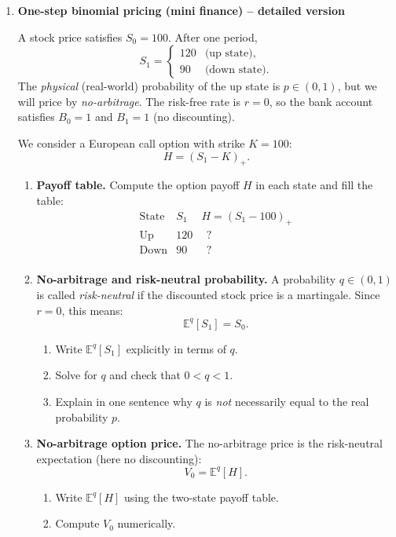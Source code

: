 \documentclass[11pt]{article}
\begin{document}
\begin{enumerate}
\bigskip

\item \textbf{One-step binomial pricing (mini finance) -- detailed version}

A stock price satisfies \(S_0=100\). After one period,
\[
S_1=
\begin{cases}
120 & \text{(up state)},\\
90  & \text{(down state)}.
\end{cases}
\]
The \emph{physical} (real-world) probability of the up state is \(p\in(0,1)\),
but we will price by \emph{no-arbitrage}. The risk-free rate is \(r=0\),
so the bank account satisfies \(B_0=1\) and \(B_1=1\) (no discounting).

We consider a European call option with strike \(K=100\):
\[
H=(S_1-K)_+.
\]

\begin{enumerate}
\item \textbf{Payoff table.}
Compute the option payoff \(H\) in each state and fill the table:
\[
\begin{array}{c|c|c}
\text{State} & S_1 & H=(S_1-100)_+\\ \hline
\text{Up} & 120 & \ \ ? \ \\
\text{Down} & 90 & \ \ ? \ \\
\end{array}
\]

\item \textbf{No-arbitrage and risk-neutral probability.}
A probability \(q\in(0,1)\) is called \emph{risk-neutral} if the discounted stock price
is a martingale. Since \(r=0\), this means:
\[
\mathbb{E}^q[S_1]=S_0.
\]
\begin{enumerate}
\item Write \(\mathbb{E}^q[S_1]\) explicitly in terms of \(q\).
\item Solve for \(q\) and check that \(0<q<1\).
\item Explain in one sentence why \(q\) is \emph{not} necessarily equal to the real probability \(p\).
\end{enumerate}

\item \textbf{No-arbitrage option price.}
The no-arbitrage price is the risk-neutral expectation (here no discounting):
\[
V_0=\mathbb{E}^q[H].
\]
\begin{enumerate}
\item Write \(\mathbb{E}^q[H]\) using the two-state payoff table.
\item Compute \(V_0\) numerically.
\end{enumerate}


\end{enumerate}
\end{enumerate}
\end{document}
